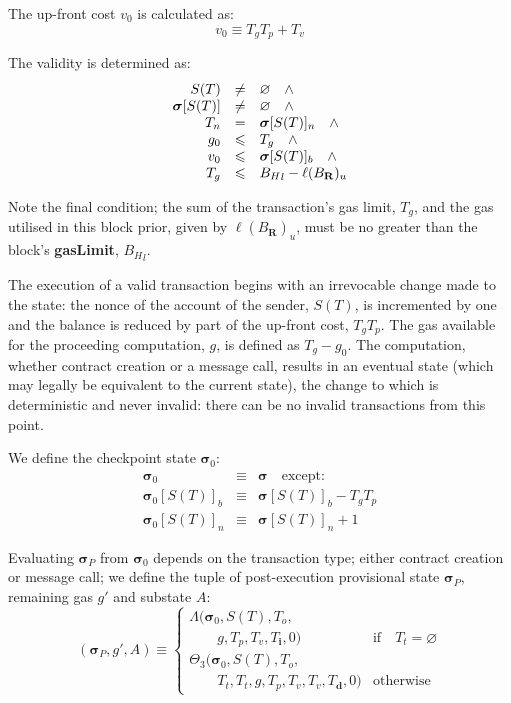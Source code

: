 \documentclass[9pt,oneside]{amsart}
\begin{document}
\begin{multicols}{2}
The up-front cost $v_0$ is calculated as:
\begin{equation}
v_0 \equiv T_g T_p + T_v
\end{equation}

The validity is determined as:
\begin{equation}
\begin{array}[t]{rcl}
S(T) & \neq & \varnothing \quad \wedge \\
\boldsymbol{\sigma}[S(T)] & \neq & \varnothing \quad \wedge \\
T_n & = & \boldsymbol{\sigma}[S(T)]_n \quad \wedge \\
g_0 & \leqslant & T_g \quad \wedge \\
v_0 & \leqslant & \boldsymbol{\sigma}[S(T)]_b \quad \wedge \\
T_g & \leqslant & {B_H}_l - \ell(B_\mathbf{R})_u
\end{array}
\end{equation}

Note the final condition; the sum of the transaction's gas limit, $T_g$, and the gas utilised in this block prior, given by $\ell(B_\mathbf{R})_u$, must be no greater than the block's \textbf{gasLimit}, ${B_H}_l$.

The execution of a valid transaction begins with an irrevocable change made to the state: the nonce of the account of the sender, $S(T)$, is incremented by one and the balance is reduced by part of the up-front cost, $T_gT_p$. The gas available for the proceeding computation, $g$, is defined as $T_g - g_0$. The computation, whether contract creation or a message call, results in an eventual state (which may legally be equivalent to the current state), the change to which is deterministic and never invalid: there can be no invalid transactions from this point.

We define the checkpoint state $\boldsymbol{\sigma}_0$:
\begin{eqnarray}
\boldsymbol{\sigma}_0 & \equiv & \boldsymbol{\sigma} \quad \text{except:} \\
\boldsymbol{\sigma}_0[S(T)]_b & \equiv & \boldsymbol{\sigma}[S(T)]_b - T_g T_p \\
\boldsymbol{\sigma}_0[S(T)]_n & \equiv & \boldsymbol{\sigma}[S(T)]_n + 1
\end{eqnarray}

Evaluating $\boldsymbol{\sigma}_P$ from $\boldsymbol{\sigma}_0$ depends on the transaction type; either contract creation or message call; we define the tuple of post-execution provisional state $\boldsymbol{\sigma}_P$, remaining gas $g'$ and substate $A$:
\begin{equation}
(\boldsymbol{\sigma}_P, g', A) \equiv \begin{cases}
\Lambda(\boldsymbol{\sigma}_0, S(T), T_o, &\\ \quad\quad g, T_p, T_v, T_\mathbf{i}, 0) & \text{if} \quad T_t = \varnothing \\
\Theta_{3}(\boldsymbol{\sigma}_0, S(T), T_o, &\\ \quad\quad T_t, T_t, g, T_p, T_v, T_v, T_\mathbf{d}, 0) & \text{otherwise}
\end{cases}
\end{equation}


\end{multicols}
\end{document}
